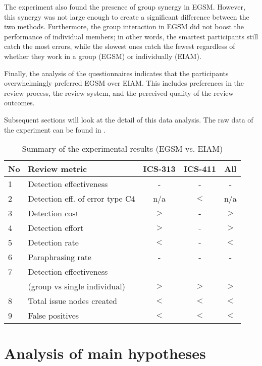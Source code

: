 The experiment also found the presence of group synergy in EGSM.
However, this synergy was not large enough to
create a significant difference between the two methods.
Furthermore, the group interaction in EGSM
did not boost the performance of individual members; in other words,
the smartest participants still catch the most errors, while the
slowest ones catch the fewest regardless of whether they work in
a group (EGSM) or individually (EIAM).


Finally, the analysis of the questionnaires indicates that
the participants overwhelmingly preferred EGSM over EIAM. This
includes preferences in the review process, the review system, and
the perceived quality of the review outcomes.

Subsequent sections will look at the detail of this data
analysis. The raw data of the experiment can be found in
\cite{csdl-95-13}.  


\begin{table}[htb]
 \caption{Summary of the experimental results (EGSM vs. EIAM)}
  \begin{center}
  \begin{tabular}{|l|l|c|c|c|}
   \hline
No &  Review metric         & ICS-313 & ICS-411 & All \\
   \hline
1 &   Detection effectiveness & -       & -       & - \\
2 &   Detection eff. of error type C4   & n/a     & $<$     & n/a \\   
3 &   Detection cost          & $>$     & -       & $>$ \\  
4 &   Detection effort        & $>$     & -       & $>$ \\
5 &   Detection rate          & $<$     & -       & $<$ \\
6 &   Paraphrasing rate       &  -      & -       & - \\
7 &  Detection effectiveness &       &        &  \\
   &  (group vs single individual) & $>$   & $>$     & $>$ \\
8 & Total issue nodes created &  $<$    & $<$     & $<$ \\
9 &   False positives         & $<$     & $<$     & $<$ \\
  \hline
   \end{tabular}
  \end{center}
 \label{summary}
\end{table}


\section {Analysis of main hypotheses}
\label{sec:main-hypothesis}

